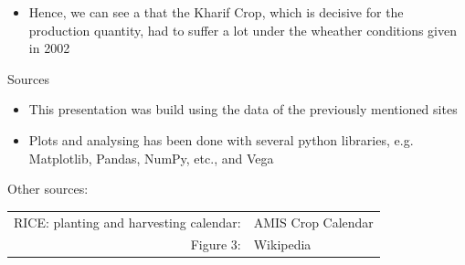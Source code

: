 \documentclass[10pt]{beamer}
\begin{document}
\begin{frame}
	\begin{itemize}
		\item \large Hence, we can see a that the Kharif Crop, which is decisive for the production quantity, had to suffer a lot under the wheather conditions given in 2002
	\end{itemize}
	
\end{frame}

\begin{frame}{Sources}
	\begin{itemize}
		\item This presentation was build using the data of the previously mentioned sites
		\item Plots and analysing has been done with several python libraries, e.g. Matplotlib, Pandas, NumPy, etc., and Vega
	\end{itemize}
	Other sources:\\
	\vspace{0.25cm}
	\begin{tabular}{rl}
		RICE: planting and harvesting calendar:& AMIS Crop Calendar\\
		Figure 3:&Wikipedia
	\end{tabular}
\end{frame}
\end{document}
